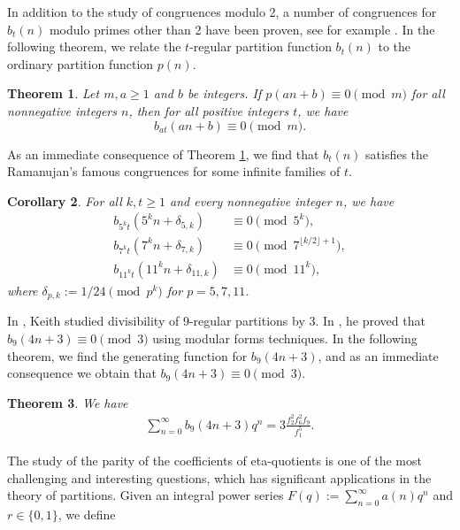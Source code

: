 \documentclass[reqno]{amsart}
\newtheorem{theorem}{Theorem}[section]
\newtheorem{corollary}[theorem]{Corollary}
\theoremstyle{definition}
\theoremstyle{remark}
\numberwithin{equation}{section}
\begin{document}
In addition to the study of congruences modulo 2, a number of congruences for $b_t (n)$ modulo primes other than 2 have been proven, see for example \cite{baruahdas, cui_Gu_2015, gordon1997, Keith2014}. 
In the following theorem, we relate the $t$-regular partition function $b_{t}(n)$ to the ordinary partition function $p(n)$. 
\begin{theorem}\label{thm5}
	Let $m,a\geq1$ and $b$ be integers. If $p(an+b)\equiv0\pmod{m}$ for all nonnegative integers $n$, then for all positive integers $t$, we have
	\begin{equation*}
	b_{at}(an+b)\equiv0\pmod{m}.
	\end{equation*} 
\end{theorem}
As an immediate consequence of Theorem \ref{thm5}, we find that $b_{t}(n)$ satisfies the Ramanujan's famous congruences for some infinite families of $t$. 
\begin{corollary}\label{cor2}
	For all $k,t\geq1$ and every nonnegative integer $n$, we have
	\begin{align*}
	b_{5^{k}t}\left( 5^{k}n+\delta_{5,k}\right) & \equiv0 \pmod{5^{k}},\\
	b_{7^{k}t}\left(7^{k}n+\delta_{7,k}\right)&\equiv0\pmod{7^{\lfloor k/2\rfloor+1}} ,\\
	b_{{11}^{k}t}\left(11^{k}n+\delta_{11,k}\right)&\equiv0\pmod{11^{k}}, 
	\end{align*}
	where $\delta_{p,k}:=1/24\pmod{p^k}$ for $p=5,7,11$. 
\end{corollary}
In \cite{Keith2014}, Keith studied divisibility of 9-regular partitions by 3. In \cite[Theorem 1]{Keith2014}, he proved that $b_9(4n+3)\equiv 0\pmod 3$ using modular forms techniques. 
In the following theorem, we find the generating function for $b_9(4n+3)$, and as an immediate consequence we obtain that $b_9(4n+3)\equiv 0\pmod 3$.
\begin{theorem}\label{thm6}
	We have
	\begin{align}\label{b9modidentity}
	\sum_{n=0}^{\infty}b_9(4n+3)q^{n}=3\frac{f^{2}_2f^{2}_6f_9}{f^{5}_1}.
	\end{align}
\end{theorem} 
The study of the parity of the coefficients of eta-quotients is one of the most challenging and interesting questions, which has significant applications in the theory of partitions. Given an integral power series $F(q):=\sum_{n=0}^{\infty}a(n)q^n$ and $r\in \{0, 1\}$, we define
\end{document}
